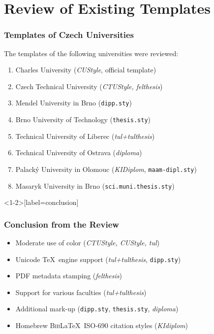\documentclass[11pt,twoside]{article}
\def\pkg#1{{\sf#1}}
\let\pkg\emph
\let\oldframetitle\frametitle
\def\frametitle#1{\oldframetitle{#1}\noindent}
\begin{document}
\section{Review of Existing Templates}
\def\right#1{{\hfill\ifbeamerarticle\else
    \textcolor{white!33!black}{\scriptsize
  \fi(#1)\ifbeamerarticle\else}\fi}}
\begin{frame}[fragile]
  \frametitle{Templates of Czech Universities}
  The templates of the following universities were reviewed:
  \begin{enumerate}
    \item Charles University\right{\pkg{CUStyle}, official template}
    \item Czech Technical University\right{\pkg{CTUStyle, felthesis}}
    \item Mendel University in Brno\right{\texttt{dipp.sty}}
    \item Brno University of Technology\right{\texttt{thesis.sty}}
    \item Technical University of Liberec\right{\pkg{tul+tulthesis}}
    \item Technical University of Ostrava\right{\pkg{diploma}}
    \item Palacký University in Olomouc\right{\pkg{KIDiplom},
      \texttt{maam-dipl.sty}}
    \item Masaryk University in Brno\right{\texttt{sci.muni.thesis.sty}}
  \end{enumerate}
\end{frame}
\begin{frame}<1-2>[label=conclusion]
  \frametitle{Conclusion from the Review}
  \begin{itemize}
    \item<1,4,5> Moderate use of color \right{\pkg{CTUStyle, CUStyle,
      tul}}
    \item<1,4,6> Unicode \TeX\ engine support\right{\pkg{tul+tulthesis},
      \texttt{dipp.sty}}
    \item<1,4,6> PDF metadata stamping \right{\pkg{felthesis}}
    \item<1,4,7> Support for various
      faculties\right{\pkg{tul+tulthesis}}
    \item<2> Additional mark-up
      \right{\texttt{dipp.sty}, \texttt{thesis.sty}, \pkg{diploma}}
    \item<2> Homebrew \textsc{Bib}\LaTeX\ ISO-690 citation styles
      \right{\pkg{KIdiplom}}
  \end{itemize}%
\end{frame}
\clearpage
\end{document}
